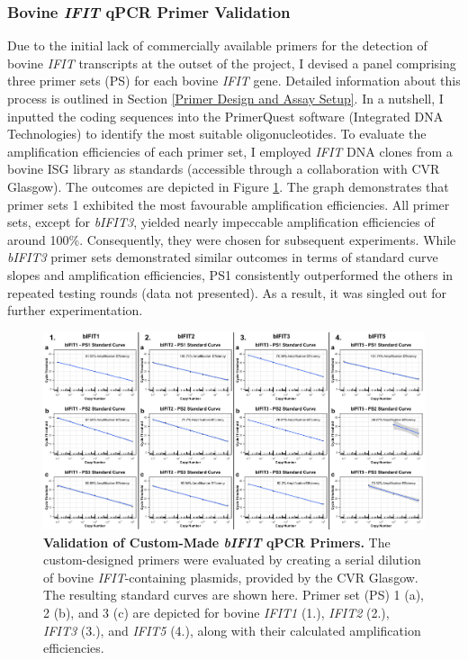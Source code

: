 \subsubsection{Bovine \textit{IFIT} qPCR Primer Validation} \label{Bovine IFIT qPCR Primer Validation}
Due to the initial lack of commercially available primers for the detection of bovine \textit{IFIT} transcripts at the outset of the project, I devised a panel comprising three primer sets (PS) for each bovine \textit{IFIT} gene. Detailed information about this process is outlined in Section \ref{Primer Design and Assay Setup}. In a nutshell, I inputted the coding sequences into the PrimerQuest software (Integrated DNA Technologies) to identify the most suitable oligonucleotides. To evaluate the amplification efficiencies of each primer set, I employed \textit{IFIT} DNA clones from a bovine ISG library as standards (accessible through a collaboration with CVR Glasgow). The outcomes are depicted in Figure \ref{Validation of custom-made bIFIT qPCR primers}. The graph demonstrates that primer sets 1 exhibited the most favourable amplification efficiencies. All primer sets, except for \textit{bIFIT3}, yielded nearly impeccable amplification efficiencies of around 100\%. Consequently, they were chosen for subsequent experiments. While \textit{bIFIT3} primer sets demonstrated similar outcomes in terms of standard curve slopes and amplification efficiencies, PS1 consistently outperformed the others in repeated testing rounds (data not presented). As a result, it was singled out for further experimentation.

\begin{figure}
    \centering
    \includegraphics[width=1\linewidth]{07. Chapter 2/Figs/01. Technologies/02. primer validation.pdf}
    \caption[Validation of Custom-Made \textit{bIFIT} qPCR Primers.]{\textbf{Validation of Custom-Made \textit{bIFIT} qPCR Primers.} The custom-designed primers were evaluated by creating a serial dilution of bovine \textit{IFIT}-containing plasmids, provided by the CVR Glasgow. The resulting standard curves are shown here. Primer set (PS) 1 (a), 2 (b), and 3 (c) are depicted for bovine \textit{IFIT1} (1.), \textit{IFIT2} (2.), \textit{IFIT3} (3.), and \textit{IFIT5} (4.), along with their calculated amplification efficiencies.}
    \label{Validation of custom-made bIFIT qPCR primers}
\end{figure}

